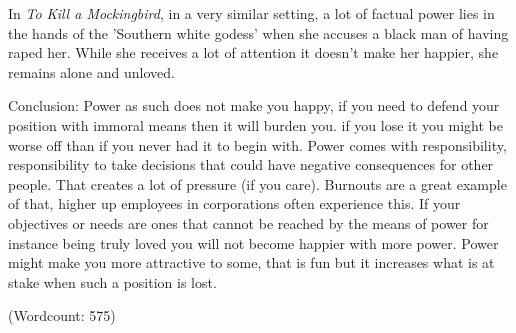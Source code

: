 \documentclass[12pt, letterpaper, twoside]{article}
\begin{document}
\begin{flushleft}
\pagebreak

In \textit{To Kill a Mockingbird}, in a very similar setting, a lot of factual power lies in the hands of the 'Southern white godess'
when she accuses a black man of having raped her. While she receives a lot of attention it doesn't make her happier,
she remains alone and unloved.


\hfill

Conclusion: Power as such does not make you happy, if you need to defend your position with immoral means then it will burden you.
if you lose it you might be worse off than if you never had it to begin with.
Power comes with responsibility, responsibility to take decisions that could have negative consequences for other people.
That creates a lot of pressure (if you care).
Burnouts are a great example of that, higher up employees in corporations often experience this.
If your objectives or needs are ones that cannot be reached by the means of power for instance being truly loved
you will not become happier with more power. Power might make you more attractive to some, that is fun but it increases what is
at stake when such a position is lost.

\hfill

(Wordcount: 575)

\end{flushleft}
\end{document}
